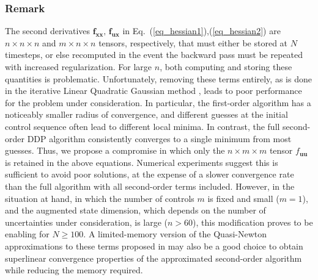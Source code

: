 \documentclass[journal ]{new-aiaa}
\newcommand{\state}{\ensuremath{\mathbf{x}}}
\newcommand{\control}{\ensuremath{\mathbf{u}}}
\begin{document}
\subsubsection*{Remark} The second derivatives $\mathbf{f}_{\state\state},\, \mathbf{f}_{\control\state}$ in Eq.~(\ref{eq_hessian1}),(\ref{eq_hessian2}) are $n\times n\times n$ and $m\times n\times n$ tensors, respectively, that must either be stored at $N$ timesteps, or else recomputed in the event the backward pass must be repeated with increased regularization. For large $n$, both computing and storing these quantities is problematic. Unfortunately, removing these terms entirely, as is done in the iterative Linear Quadratic Gaussian method \cite{iLQG}, leads to poor performance for the problem under consideration. In particular, the first-order algorithm has a noticeably smaller radius of convergence, and different guesses at the initial control sequence often lead to different local minima. In contrast, the full second-order DDP algorithm consistently converges to a single minimum from most guesses. Thus, we propose a compromise in which only the $n\times m \times m$ tensor $f_{\control\control}$ is retained in the above equations. Numerical experiments suggest this is sufficient to avoid poor solutions, at the expense of a slower convergence rate than the full algorithm with all second-order terms included. However, in the situation at hand, in which the number of controls $m$ is fixed and small ($ m=1 $), and the augmented state dimension, which depends on the number of uncertainties under consideration, is large ($n>60$), this modification proves to be enabling for $N\geq 100$. A limited-memory version of the Quasi-Newton approximations to these terms proposed in \cite{QNDDP} may also be a good choice to obtain superlinear convergence properties of the approximated second-order algorithm while reducing the memory required. 
\end{document}
